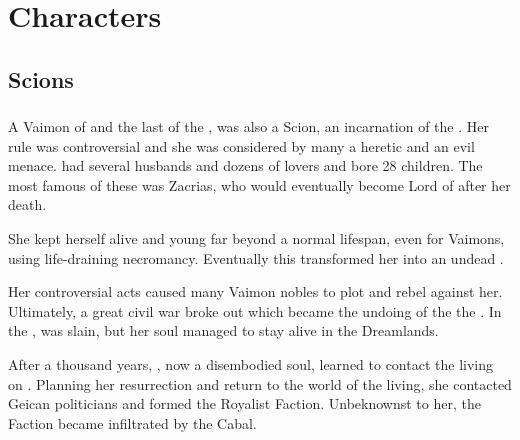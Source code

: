 \part{\Human Characters}























\chapter{Scions}















\section{\Belzir}
\index{\Belzir}
A Vaimon of \ClanGeican and the last \Calipha of the \VaimonCaliphate, \Belzir{} was also a Scion, an incarnation of the \Malach{} \Shiaraid. Her rule was controversial and she was considered by many a heretic and an evil menace. \Belzir{} had several husbands and dozens of lovers and bore 28 children. The most famous of these was Zacrias, who would eventually become Lord of \ClanGeican after her death. 

She kept herself alive and young far beyond a normal lifespan, even for Vaimons, using life-draining necromancy. Eventually this transformed her into an undead \Reaver. 

Her controversial acts caused many Vaimon nobles to plot and rebel against her. Ultimately, a great civil war broke out which became the undoing of the \VaimonCaliphate\dash the \darkfall. In the \darkfall{}, \Belzir{} was slain, but her soul managed to stay alive in the Dreamlands. 

After a thousand years, \Belzir{}, now a disembodied soul, learned to  contact the living on \Miith{}. Planning her resurrection and return to the world of the living, she contacted Geican politicians and formed the Royalist Faction. Unbeknownst to her, the Faction became infiltrated by the Cabal. 

